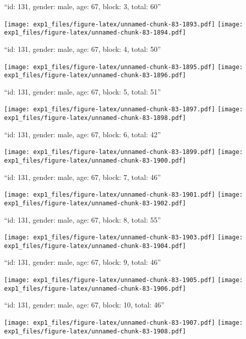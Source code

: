 \documentclass[11pt,,]{article}
\begin{document}
\newpage
[1] 

``id: 131, gender: male, age: 67, block: 3, total: 60''

\texttt{[image: exp1\_files/figure-latex/unnamed-chunk-83-1893.pdf]}
\texttt{[image: exp1\_files/figure-latex/unnamed-chunk-83-1894.pdf]}

\newpage
[1] 

``id: 131, gender: male, age: 67, block: 4, total: 50''

\texttt{[image: exp1\_files/figure-latex/unnamed-chunk-83-1895.pdf]}
\texttt{[image: exp1\_files/figure-latex/unnamed-chunk-83-1896.pdf]}

\newpage
[1] 

``id: 131, gender: male, age: 67, block: 5, total: 51''

\texttt{[image: exp1\_files/figure-latex/unnamed-chunk-83-1897.pdf]}
\texttt{[image: exp1\_files/figure-latex/unnamed-chunk-83-1898.pdf]}

\newpage
[1] 

``id: 131, gender: male, age: 67, block: 6, total: 42''

\texttt{[image: exp1\_files/figure-latex/unnamed-chunk-83-1899.pdf]}
\texttt{[image: exp1\_files/figure-latex/unnamed-chunk-83-1900.pdf]}

\newpage
[1] 

``id: 131, gender: male, age: 67, block: 7, total: 46''

\texttt{[image: exp1\_files/figure-latex/unnamed-chunk-83-1901.pdf]}
\texttt{[image: exp1\_files/figure-latex/unnamed-chunk-83-1902.pdf]}

\newpage
[1] 

``id: 131, gender: male, age: 67, block: 8, total: 55''

\texttt{[image: exp1\_files/figure-latex/unnamed-chunk-83-1903.pdf]}
\texttt{[image: exp1\_files/figure-latex/unnamed-chunk-83-1904.pdf]}

\newpage
[1] 

``id: 131, gender: male, age: 67, block: 9, total: 46''

\texttt{[image: exp1\_files/figure-latex/unnamed-chunk-83-1905.pdf]}
\texttt{[image: exp1\_files/figure-latex/unnamed-chunk-83-1906.pdf]}

\newpage
[1] 

``id: 131, gender: male, age: 67, block: 10, total: 46''

\texttt{[image: exp1\_files/figure-latex/unnamed-chunk-83-1907.pdf]}
\texttt{[image: exp1\_files/figure-latex/unnamed-chunk-83-1908.pdf]}
\end{document}
